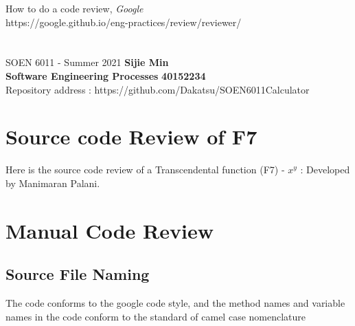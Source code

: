 \documentclass[letterpaper, 11pt]{report}
\begin{document}
\begin{thebibliography}{}
How to do a code review, \textit{Google}
\\https://google.github.io/eng-practices/review/reviewer/
\end{thebibliography}

\pagebreak

\section*{}
\normalsize {SOEN 6011 - Summer 2021} \hfill \textbf{Sijie Min} \\
\textbf{ Software Engineering Processes}  \hfill \textbf{40152234} \\
\hfill Repository address : https://github.com/Dakatsu/SOEN6011Calculator
\\

\section*{Source code Review of F7}
Here is the source code review of a  Transcendental function (F7) - $x^y$ : Developed by Manimaran Palani.
\section*{Manual Code Review}
\subsection*{Source File Naming}
The code conforms to the google code style, and the method names and variable names in the code conform to the standard of camel case nomenclature
\end{document}
